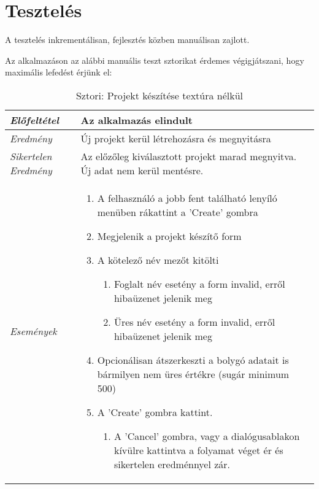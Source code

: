 \chapter{Tesztelés}
\label{ch:intro}

A tesztelés inkrementálisan, fejlesztés közben manuálisan zajlott.

Az alkalmazáson az alábbi manuális teszt sztorikat érdemes végigjátszani, hogy maximális lefedést érjünk el:

\begin{table}[H]
	\centering
	\begin{tabular}{ | m{} | m{} | }
		\hline
		\emph{Előfeltétel} & Az alkalmazás elindult  \\
		\hline
		\emph{Eredmény} & Új projekt kerül létrehozásra és megnyitásra  \\
		\hline
		\emph{Sikertelen Eredmény} & Az előzőleg kiválasztott projekt marad megnyitva. Új adat nem kerül mentésre.  \\
		\hline
		\emph{Események} &

		\begin{enumerate}
			\item A felhasználó a jobb fent található lenyíló menüben rákattint a 'Create' gombra
			\item Megjelenik a projekt készítő form
			\item A kötelező név mezőt kitölti
			\begin{enumerate}
				\item Foglalt név esetény a form invalid, erről hibaüzenet jelenik meg
				\item Üres név esetény a form invalid, erről hibaüzenet jelenik meg
			\end{enumerate}
			\item Opcionálisan átszerkeszti a bolygó adatait is bármilyen nem üres értékre (sugár minimum 500)
			\item A 'Create' gombra kattint.
			\begin{enumerate}
				\item A 'Cancel' gombra, vagy a dialógusablakon kívülre kattintva a folyamat véget ér és sikertelen eredménnyel zár.
			\end{enumerate}
		\end{enumerate}

		\\
		\hline
	\end{tabular}
	\caption{Sztori: Projekt készítése textúra nélkül}
	\label{tab:story-project-create}
\end{table}

